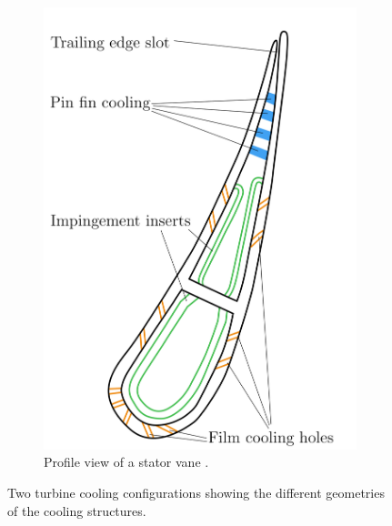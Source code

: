 \documentclass[a4paper, 11pt]{report}
\theoremstyle{definition}
\begin{document}
\begin{figure}[H]
\begin{subfigure}{.49\textwidth}
				\includegraphics[width=.9\textwidth]{../assets/gth_rebuild/11.png}
				\caption{Profile view of a stator vane \cite{Giampaolo2020}.}
			\end{subfigure}
			\caption{Two turbine cooling configurations showing the different geometries of the cooling structures.}
			\label{fig:rollsroyce}
		\end{figure}
\end{document}
